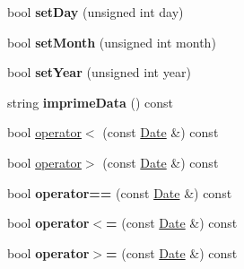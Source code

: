\begin{DoxyCompactItemize}
\item 
\hypertarget{class_date_aff23cb89959285d5743471cfb8de79be}{bool {\bfseries set\+Day} (unsigned int day)}\label{class_date_aff23cb89959285d5743471cfb8de79be}

\item 
\hypertarget{class_date_a317a64663663c32417496549da4b52ef}{bool {\bfseries set\+Month} (unsigned int month)}\label{class_date_a317a64663663c32417496549da4b52ef}

\item 
\hypertarget{class_date_aae265e5db481eaae2859cbfb2b2d4b1f}{bool {\bfseries set\+Year} (unsigned int year)}\label{class_date_aae265e5db481eaae2859cbfb2b2d4b1f}

\item 
\hypertarget{class_date_a5b5824086305fb1da07e18b78646f755}{string {\bfseries imprime\+Data} () const }\label{class_date_a5b5824086305fb1da07e18b78646f755}

\item 
bool \hyperlink{class_date_a691bafd5bba9540f3c540f7327a758c2}{operator$<$} (const \hyperlink{class_date}{Date} \&) const 
\item 
bool \hyperlink{class_date_a0bd06d545842c948cdca8ccc60d7d68d}{operator$>$} (const \hyperlink{class_date}{Date} \&) const 
\item 
\hypertarget{class_date_ad54d8e4b8f2ad6df8eda3b8615c3c0b2}{bool {\bfseries operator==} (const \hyperlink{class_date}{Date} \&) const }\label{class_date_ad54d8e4b8f2ad6df8eda3b8615c3c0b2}

\item 
\hypertarget{class_date_a6632fd56fe1c549ef0a257c85fd8eb3e}{bool {\bfseries operator$<$=} (const \hyperlink{class_date}{Date} \&) const }\label{class_date_a6632fd56fe1c549ef0a257c85fd8eb3e}

\item 
\hypertarget{class_date_ae4802fa52cf81f1a259b4a3b88bffc0d}{bool {\bfseries operator$>$=} (const \hyperlink{class_date}{Date} \&) const }\label{class_date_ae4802fa52cf81f1a259b4a3b88bffc0d}

\end{DoxyCompactItemize}


